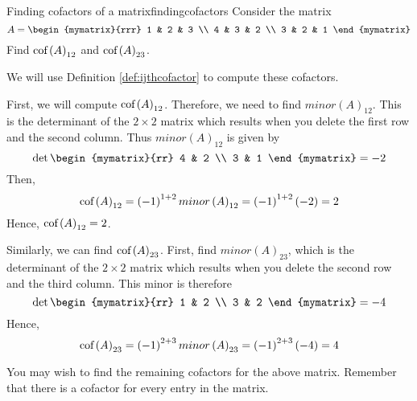 \begin{example}{Finding cofactors of a matrix}{findingcofactors}
Consider the matrix
\begin{equation*}
A=\begin{mymatrix}{rrr}
1 & 2 & 3 \\
4 & 3 & 2 \\
3 & 2 & 1
\end{mymatrix} 
\end{equation*}
Find $\mbox{cof}\left( A\right) _{12}$ and $\mbox{cof}\left( A\right) _{23}$.
\end{example}

\begin{solution} We will use Definition \ref{def:ijthcofactor} to compute these cofactors. 

First, we will compute $\mbox{cof}\left( A\right) _{12}$. 
Therefore, we need to find $minor\left(A\right)_{12}$. This is the determinant of the $2\times 2$ matrix
which results when you delete the first row and the second column. Thus $minor\left(A\right)_{12}$ is given by 
\begin{equation*}
\det \begin{mymatrix}{rr}
4 & 2 \\
3 & 1
\end{mymatrix} = -2
\end{equation*}
Then,
\begin{equation*}
\mbox{cof}\left( A\right) _{12}=\left( -1\right) ^{1+2} minor\left(A\right)_{12} =\left( -1\right) ^{1+2}\left( -2\right) =2
\end{equation*}
Hence, $\mbox{cof}\left( A\right) _{12}=2$.

Similarly, we can find $\mbox{cof}\left( A\right) _{23}$. First, find $minor\left(A\right)_{23}$, which is the determinant of the $2\times 2$ matrix
which results when you delete the second row and the third column. This
minor is therefore
\begin{equation*}
\det \begin{mymatrix}{rr}
1 & 2 \\
3 & 2
\end{mymatrix} = -4
\end{equation*}
Hence,
\begin{equation*}
\mbox{cof}\left( A\right) _{23}=\left( -1\right) ^{2+3} minor\left(A\right)_{23} =\left( -1\right) ^{2+3}\left( -4\right) =4
\end{equation*}
\end{solution}

You may wish to find the remaining cofactors for the above matrix. Remember that there is a cofactor 
for every entry in the matrix.  

